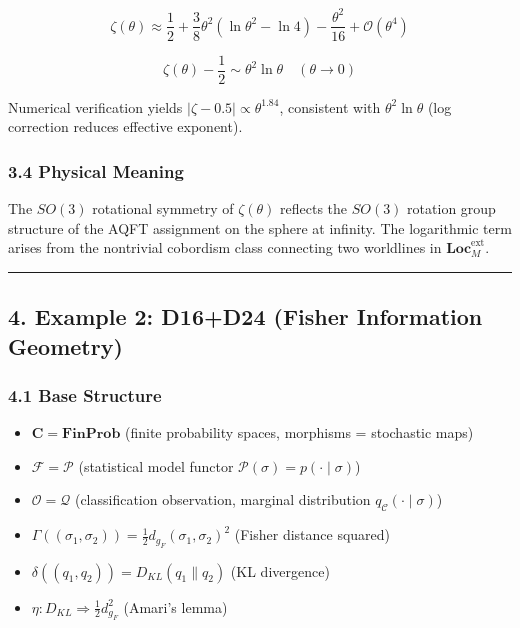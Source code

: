 \documentclass[
]{article}
\providecommand{\tightlist}{%
  \setlength{\itemsep}{0pt}\setlength{\parskip}{0pt}}
\begin{document}
\[\zeta(\theta) \approx \frac{1}{2} + \frac{3}{8}\theta^2(\ln \theta^2 - \ln 4) - \frac{\theta^2}{16} + \mathcal{O}(\theta^4)\]

\[\zeta(\theta) - \frac{1}{2} \sim \theta^2 \ln \theta \quad (\theta \to 0)\]

Numerical verification yields \(|\zeta - 0.5| \propto \theta^{1.84}\),
consistent with \(\theta^2 \ln\theta\) (log correction reduces effective
exponent).

\subsubsection{3.4 Physical Meaning}\label{physical-meaning}

The \(SO(3)\) rotational symmetry of \(\zeta(\theta)\) reflects the
\(SO(3)\) rotation group structure of the AQFT assignment on the sphere
at infinity. The logarithmic term arises from the nontrivial cobordism
class connecting two worldlines in \(\mathbf{Loc}_M^{\text{ext}}\).

\begin{center}\rule{0.5\linewidth}{0.5pt}\end{center}

\subsection{4. Example 2: D16+D24 (Fisher Information
Geometry)}\label{example-2-d16d24-fisher-information-geometry}

\subsubsection{4.1 Base Structure}\label{base-structure-1}

\begin{itemize}
\tightlist
\item
  \(\mathbf{C} = \mathbf{FinProb}\) (finite probability spaces,
  morphisms = stochastic maps)
\item
  \(\mathcal{F} = \mathcal{P}\) (statistical model functor
  \(\mathcal{P}(\sigma) = p(\cdot \mid \sigma)\))
\item
  \(\mathcal{O} = \mathcal{Q}\) (classification observation, marginal
  distribution \(q_{\mathcal{C}}(\cdot \mid \sigma)\))
\item
  \(\Gamma((\sigma_1, \sigma_2)) = \frac{1}{2} d_{g_F}(\sigma_1, \sigma_2)^2\)
  (Fisher distance squared)
\item
  \(\delta((q_1, q_2)) = D_{KL}(q_1 \parallel q_2)\) (KL divergence)
\item
  \(\eta: D_{KL} \Rightarrow \frac{1}{2} d_{g_F}^2\) (Amari's lemma)
\end{itemize}
\end{document}
